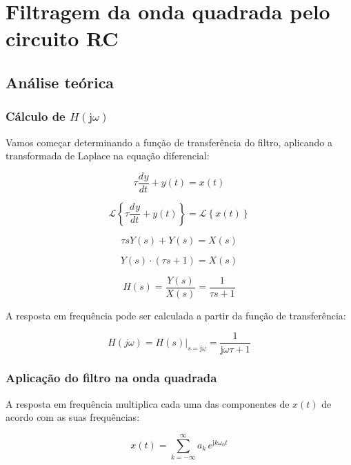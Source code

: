 \documentclass[10pt,twocolumn]{article}
\renewcommand{\j}{\ensuremath{\mathrm{j}}}
\newcommand{\deriv}[3]{\frac{d^{#3} #1}{{d#2}^{#3}}}
\newcommand{\lt}[1]{\mathcal{L}\left\{#1\right\}}
\newcommand{\?}{\stackrel{?}{=}}
\begin{document}
\section{Filtragem da onda quadrada pelo circuito RC}

\subsection{Análise teórica}

\subsubsection{Cálculo de $H(\j\omega)$}

Vamos começar determinando a função de transferência do filtro, aplicando a transformada de Laplace na equação diferencial:

\begin{equation*}
	\tau\deriv{y}{t}{}+y(t)=x(t)
\end{equation*}

\begin{equation*}
	\lt{\tau\deriv{y}{t}{}+y(t)}=\lt{x(t)}
\end{equation*}

\begin{equation*}
	\tau sY(s)+Y(s)=X(s)
\end{equation*}

\begin{equation*}
	Y(s)\cdot(\tau s+1)=X(s)
\end{equation*}

\begin{equation*}
	H(s)=\frac{Y(s)}{X(s)}=\frac{1}{\tau s+1}
\end{equation*}

A resposta em frequência pode ser calculada a partir da função de transferência:

\begin{equation*}
	H(j\omega)=H(s)\biggr\rvert_{s=\j\omega}=\frac{1}{\j\omega\tau+1}
\end{equation*}

\subsubsection{Aplicação do filtro na onda quadrada}

A resposta em frequência multiplica cada uma das componentes de $x(t)$ de acordo com as suas frequências:

\begin{equation*}
	x(t)=\sum_{k=-\infty}^{\infty}a_k\,e^{\j k\omega_0t}
\end{equation*}
\end{document}
